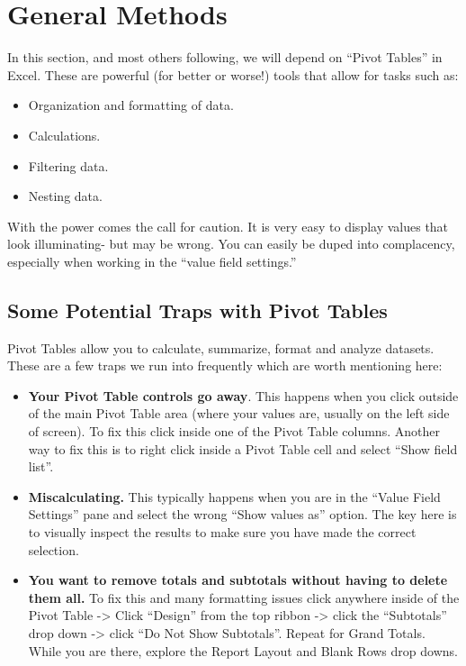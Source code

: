 \documentclass[
]{book}
\providecommand{\tightlist}{%
  \setlength{\itemsep}{0pt}\setlength{\parskip}{0pt}}
\begin{document}
\hypertarget{general-methods}{%
\section{General Methods}\label{general-methods}}

In this section, and most others following, we will depend on ``Pivot Tables'' in Excel. These are powerful (for better or worse!) tools that allow for tasks such as:

\begin{itemize}
\tightlist
\item
  Organization and formatting of data.
\item
  Calculations.
\item
  Filtering data.
\item
  Nesting data.
\end{itemize}

With the power comes the call for caution. It is very easy to display values that look illuminating- but may be wrong. You can easily be duped into complacency, especially when working in the ``value field settings.''

\hypertarget{some-potential-traps-with-pivot-tables}{%
\subsection{Some Potential Traps with Pivot Tables}\label{some-potential-traps-with-pivot-tables}}

Pivot Tables allow you to calculate, summarize, format and analyze datasets. These are a few traps we run into frequently which are worth mentioning here:

\begin{itemize}
\tightlist
\item
  \textbf{Your Pivot Table controls go away}. This happens when you click outside of the main Pivot Table area (where your values are, usually on the left side of screen). To fix this click inside one of the Pivot Table columns. Another way to fix this is to right click inside a Pivot Table cell and select ``Show field list''.
\item
  \textbf{Miscalculating.} This typically happens when you are in the ``Value Field Settings'' pane and select the wrong ``Show values as'' option. The key here is to visually inspect the results to make sure you have made the correct selection.
\item
  \textbf{You want to remove totals and subtotals without having to delete them all.} To fix this and many formatting issues click anywhere inside of the Pivot Table -\textgreater{} Click ``Design'' from the top ribbon -\textgreater{} click the ``Subtotals'' drop down -\textgreater{} click ``Do Not Show Subtotals''. Repeat for Grand Totals. While you are there, explore the Report Layout and Blank Rows drop downs.
\end{itemize}
\end{document}
